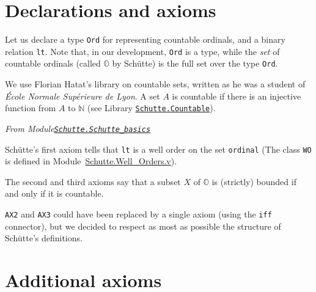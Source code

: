 \section{Declarations and axioms}

Let us declare a type 
\texttt{Ord} for representing countable ordinals, and a binary relation
 \texttt{lt}. Note that, in our development, \texttt{Ord} is a type, while the \emph{set} of countable ordinals (called $\mathbb{O}$ by Schütte) 
is the full set over the type \texttt{Ord}.

\label{types:Ord} 

We use Florian Hatat's library on countable sets, written as he was a student of  \emph{\'Ecole Normale Supérieure de Lyon}. A set $A$ is countable if there is an injective function from $A$ to $\mathbb{N}$ (see 
Library \href{../theories/html/hydras.Schutte.Countable.html}%
{\texttt{Schutte.Countable}}).


\vspace{6pt}

\emph{From Module\href{../theories/html/hydras.Schutte.Schutte_basics.html}%
{\texttt{Schutte.Schutte\_basics}}}





Schütte's first axiom tells that \texttt{lt} is a well order on the set 
\texttt{ordinal} (The  class \texttt{WO} is defined in
Module~\href{../theories/html/hydras.Schutte.Well_Orders.html}{Schutte.Well\_Orders.v}).


\label{types:WO}







The second and third axioms say that a subset $X$ of $\mathbb{O}$ is
(strictly) bounded if and only if it is countable. 




\texttt{AX2} and \texttt{AX3} could have been replaced by a single axiom (using the \texttt{iff} connector), but we decided to respect as most as possible the structure of Schütte's definitions.

\section{Additional  axioms}

